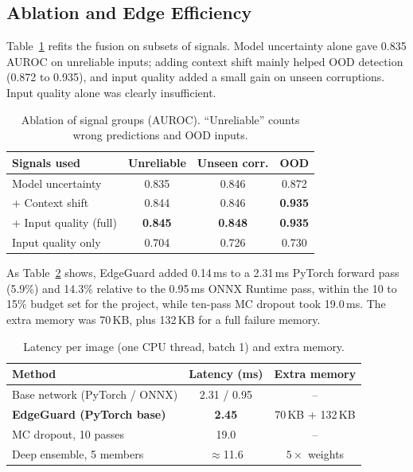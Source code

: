 \documentclass[conference]{IEEEtran}
\begin{document}
\subsection{Ablation and Edge Efficiency}

Table~\ref{tab:ablation} refits the fusion on subsets of signals. Model uncertainty alone gave 0.835 AUROC on unreliable inputs; adding context shift mainly helped OOD detection (0.872 to 0.935), and input quality added a small gain on unseen corruptions. Input quality alone was clearly insufficient.

\begin{table}[t]
\centering
\caption{Ablation of signal groups (AUROC). ``Unreliable'' counts wrong predictions and OOD inputs.}
\label{tab:ablation}
\small
\setlength{\tabcolsep}{4pt}
\begin{tabular}{lccc}
\toprule
Signals used & Unreliable & Unseen corr. & OOD \\
\midrule
Model uncertainty & 0.835 & 0.846 & 0.872 \\
+ Context shift & 0.844 & 0.846 & \textbf{0.935} \\
+ Input quality (full) & \textbf{0.845} & \textbf{0.848} & \textbf{0.935} \\
Input quality only & 0.704 & 0.726 & 0.730 \\
\bottomrule
\end{tabular}
\end{table}

As Table~\ref{tab:efficiency} shows, EdgeGuard added 0.14\,ms to a 2.31\,ms PyTorch forward pass (5.9\%) and 14.3\% relative to the 0.95\,ms ONNX Runtime pass, within the 10 to 15\% budget set for the project, while ten-pass MC dropout took 19.0\,ms. The extra memory was 70\,KB, plus 132\,KB for a full failure memory.

\begin{table}[t]
\centering
\caption{Latency per image (one CPU thread, batch 1) and extra memory.}
\label{tab:efficiency}
\small
\setlength{\tabcolsep}{4pt}
\begin{tabular}{lcc}
\toprule
Method & Latency (ms) & Extra memory \\
\midrule
Base network (PyTorch / ONNX) & 2.31 / 0.95 & -- \\
\textbf{EdgeGuard (PyTorch base)} & \textbf{2.45} & 70\,KB + 132\,KB \\
MC dropout, 10 passes & 19.0 & -- \\
Deep ensemble, 5 members & $\approx$11.6 & $5\times$ weights \\
\bottomrule
\end{tabular}
\end{table}
\end{document}
